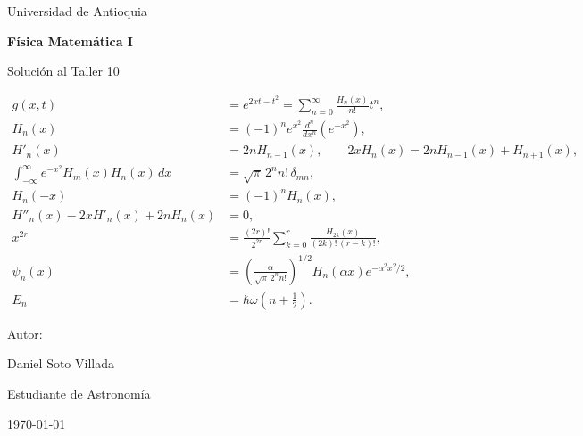 \documentclass[a4paper]{article}
\begin{document}

\begin{titlepage}
  \centering
  {\Large Universidad de Antioquia\par}
  \vspace{2cm}
  {\huge\bfseries Física Matemática I\par}
  \vspace{0.4cm}
  {\Large Solución al Taller 10 \par}
  \vspace{1.2cm}
  \begin{tcolorbox}[
    width=0.86\textwidth,
    colback=white,
    colframe=black!55,
    arc=2mm,
    boxrule=0.5pt,
    title={\centering Algunas ecuaciones del taller},
    fonttitle=\bfseries
  ]
  \begin{align*}
    g(x,t) &= e^{2xt-t^2}=\sum_{n=0}^{\infty}\frac{H_n(x)}{n!}t^n, \\
    H_n(x) &= (-1)^n e^{x^2}\frac{d^n}{dx^n}\left(e^{-x^2}\right), \\
    H'_n(x) &= 2nH_{n-1}(x),
    \qquad
    2xH_n(x)=2nH_{n-1}(x)+H_{n+1}(x), \\
    \int_{-\infty}^{\infty} e^{-x^2}H_m(x)H_n(x)\,dx
    &= \sqrt{\pi}\,2^n n!\,\delta_{mn}, \\
    H_n(-x) &= (-1)^n H_n(x), \\
    H''_n(x)-2xH'_n(x)+2nH_n(x) &= 0, \\
    x^{2r} &= \frac{(2r)!}{2^{2r}}
    \sum_{k=0}^{r}\frac{H_{2k}(x)}{(2k)!\,(r-k)!}, \\
    \psi_n(x) &= \left(\frac{\alpha}{\sqrt{\pi}\,2^n n!}\right)^{1/2}
    H_n(\alpha x)e^{-\alpha^2x^2/2}, \\
    E_n &= \hbar\omega\left(n+\frac{1}{2}\right).
  \end{align*}
  \end{tcolorbox}
  \vspace{1.2cm}
  {\large Autor:\par}
  \vspace{0.2cm}
  {\large Daniel Soto Villada\par}
  {\large Estudiante de Astronomía\par}
  \vfill
  {\large \today\par}
\end{titlepage}
\setcounter{page}{2}

\newpage
\tableofcontents
\newpage
{}
\end{document}
